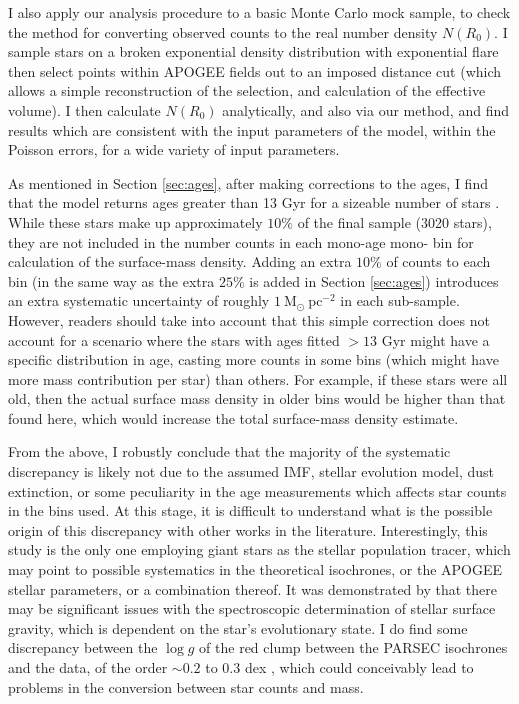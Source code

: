 I also apply our analysis procedure to a basic Monte Carlo mock sample, to check the method for converting observed counts to the real number density $N(R_0)$. I sample stars on a broken exponential density distribution with exponential flare then select points within APOGEE fields out to an imposed distance cut (which allows a simple reconstruction of the selection, and calculation of the effective volume). I then calculate $N(R_0)$ analytically, and also via our method, and find results which are consistent with the input parameters of the model, within the Poisson errors, for a wide variety of input parameters. 



As mentioned in Section \ref{sec:ages}, after making corrections to the ages, I find that the model returns ages greater than 13 Gyr for a sizeable number of stars \citep[][limit ages to 13 Gyr in their table]{2016MNRAS.456.3655M}. While these stars make up approximately $10\%$ of the final sample (3020 stars), they are not included in the number counts in each mono-age mono-\feh{} bin for calculation of the surface-mass density. Adding an extra $10\%$ of counts to each bin (in the same way as the extra $25\%$ is added in Section \ref{sec:ages}) introduces an extra systematic uncertainty of roughly $1\  \mathrm{M_{\odot}\ pc^{-2}}$ in each \afe{} sub-sample. However, readers should take into account that this simple correction does not account for a scenario where the stars with ages fitted $> 13$ Gyr might have a specific distribution in age, casting more counts in some bins (which might have more mass contribution per star) than others. For example, if these stars were all old, then the actual surface mass density in older bins would be higher than that found here, which would increase the total surface-mass density estimate. 

From the above, I robustly conclude that the majority of the systematic discrepancy is likely not due to the assumed IMF, stellar evolution model, dust extinction, or some peculiarity in the age measurements which affects star counts in the bins used. At this stage, it is difficult to understand what is the possible origin of this discrepancy with other works in the literature. Interestingly, this study is the only one employing giant stars as the stellar population tracer, which may point to possible systematics in the theoretical isochrones, or the APOGEE stellar parameters, or a combination thereof. It was demonstrated by \citet{2017A&A...597L...3M} that there may be significant issues with the spectroscopic determination of stellar surface gravity, which is dependent on the star's evolutionary state. I do find some discrepancy between the $\log{g}$ of the red clump between the PARSEC isochrones and the data, of the order $\sim 0.2$ to $0.3$ dex \citep[similar to that found by][albeit based on APOGEE-DR13 data]{2017A&A...597L...3M}, which could conceivably lead to problems in the conversion between star counts and mass. 

